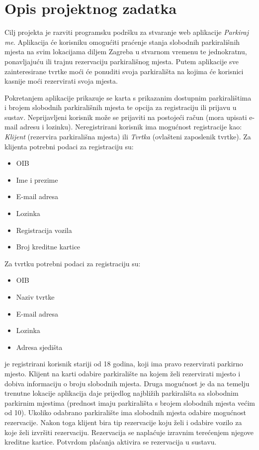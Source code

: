 \chapter{Opis projektnog zadatka}

Cilj projekta je razviti programsku podršku za stvaranje web aplikacije \textit {Parkiraj me}. Aplikacija će korisniku omogućiti praćenje stanja slobodnih parkirališnih mjesta na svim lokacijama diljem Zagreba u stvarnom vremenu te jednokratnu, ponavljajuću ili trajnu rezervaciju parkirališnog mjesta. Putem aplikacije sve zainteresirane tvrtke moći će ponuditi svoja parkirališta na kojima će korisnici kasnije moći rezervirati svoja mjesta.

Pokretanjem aplikacije prikazuje se karta s prikazanim dostupnim parkiralištima i brojem slobodnih parkirališnih mjesta te opcija za registraciju ili prijavu u sustav.\newline 
Neprijavljeni korisnik može se prijaviti na postojeći račun (mora upisati e-mail adresu i lozinku). Neregistrirani korisnik ima mogućnost registracije kao: \textit{Klijent} (rezervira parkirališna mjesta) ili \textit{Tvrtka} (ovlašteni zaposlenik tvrtke).
\newline
Za klijenta potrebni podaci za registraciju su:
\begin{itemize}
    \item OIB
    \item Ime i prezime
    \item E-mail adresa
    \item Lozinka
    \item Registracija vozila
    \item Broj kreditne kartice
\end{itemize}
Za tvrtku potrebni podaci za registraciju su:
\begin{itemize}
    \item OIB
    \item Naziv tvrtke
    \item E-mail adresa
    \item Lozinka
    \item Adresa sjedišta
\end{itemize}

\textit{} je registrirani korisnik stariji od 18 godina, koji ima pravo rezervirati parkirno mjesto. Klijent na karti odabire parkiralište na kojem želi rezervirati mjesto i dobiva informaciju o broju slobodnih mjesta. Druga mogućnost je da na temelju trenutne lokacije aplikacija daje prijedlog najbližih parkirališta sa slobodnim parkirnim mjestima (prednost imaju parkirališta s brojem slobodnih mjesta većim od 10). Ukoliko odabrano parkiralište ima slobodnih mjesta odabire mogućnost rezervacije. Nakon toga klijent bira tip rezervacije koju želi i odabire vozilo za koje želi izvršiti rezervaciju. Rezervacija se naplaćuje izravnim terećenjem njegove kreditne kartice. Potvrdom plaćanja aktivira se rezervacija u sustavu. 

